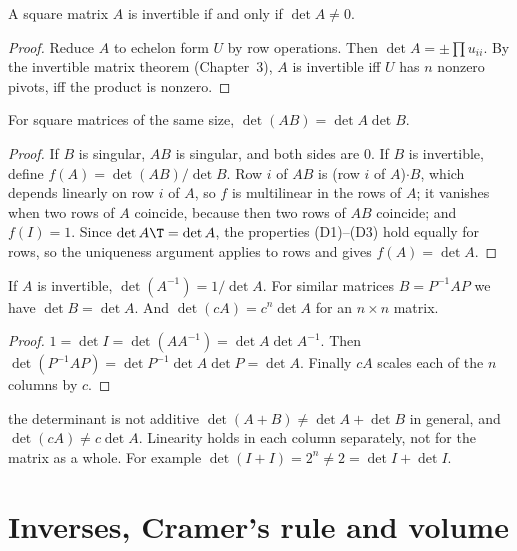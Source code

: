\begin{theorem}\label{thm:detinv}
A square matrix $A$ is invertible if and only if $\det A\ne0$.
\end{theorem}

\begin{proof}
Reduce $A$ to echelon form $U$ by row operations. Then $\det A=\pm\prod u_{ii}$. By the invertible matrix theorem (Chapter~3), $A$ is invertible iff $U$ has $n$ nonzero pivots, iff the product is nonzero.
\end{proof}

\begin{theorem}\label{thm:detprod}
For square matrices of the same size, $\det(AB)=\det A\det B$.
\end{theorem}

\begin{proof}
If $B$ is singular, $AB$ is singular, and both sides are $0$. If $B$ is invertible, define $f(A)=\det(AB)/\det B$. Row $i$ of $AB$ is (row $i$ of $A$)$\cdot B$, which depends linearly on row $i$ of $A$, so $f$ is multilinear in the rows of $A$; it vanishes when two rows of $A$ coincide, because then two rows of $AB$ coincide; and $f(I)=1$. Since $\det A\T=\det A$, the properties (D1)--(D3) hold equally for rows, so the uniqueness argument applies to rows and gives $f(A)=\det A$.
\end{proof}

\begin{corollary}\label{cor:detinv}
If $A$ is invertible, $\det(A^{-1})=1/\det A$. For similar matrices $B=P^{-1}AP$ we have $\det B=\det A$. And $\det(cA)=c^n\det A$ for an $n\times n$ matrix.
\end{corollary}

\begin{proof}
$1=\det I=\det(AA^{-1})=\det A\det A^{-1}$. Then $\det(P^{-1}AP)=\det P^{-1}\det A\det P=\det A$. Finally $cA$ scales each of the $n$ columns by $c$.
\end{proof}

\begin{pitfall}{the determinant is not additive}
$\det(A+B)\ne\det A+\det B$ in general, and $\det(cA)\ne c\det A$. Linearity holds in each column separately, not for the matrix as a whole. For example $\det(I+I)=2^n\ne2=\det I+\det I$.
\end{pitfall}

\section{Inverses, Cramer's rule and volume}

